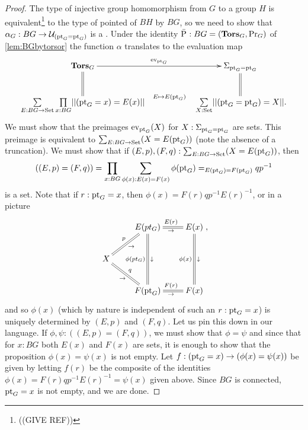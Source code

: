 \begin{proof}
  The type of injective group homomorphism from $G$ to a group $H$ is equivalent\footnote{((GIVE REF))} to the type of pointed \coverings of $BH$ by $BG$, so we need to show that $\alpha_G:BG\to\mathcal{U}_{({\mathord{\mathrm{pt}}}_G={\mathord{\mathrm{pt}}}_G)}$ is a \covering.  
Under the identity $\bar{\mathrm{P}_{}}:BG=(\mathbf{Tors}_G,\mathrm{Pr}_{{G}})$ of \cref{lem:BGbytorsor} the function $\alpha$ translates to the evaluation map
$$\xymatrix{
  \typetorsor_G\ar[rr]^-{\mathrm{ev}_{\pt_G}}\ar@{=}[d]&&\Sigma_{\pt_G=\pt_G}\ar@{=}[d]\\
  \underset{E:BG\to\Set}\sum\,\underset{x:BG}\prod||(\pt_G=x)=E(x)||\ar@{}[rr]^-{E\mapsto E(\pt_G)}&&
\,\underset{X:\Set}\sum||(\pt_G=\pt_G)=X||.
}$$
We must show that the preimages $\mathrm{ev}_{{\mathord{\mathrm{pt}}}_G}(X)$ for $X:\Sigma_{{\mathord{\mathrm{pt}}}_G={\mathord{\mathrm{pt}}}_G}$ are sets.  
This preimage is equivalent to $\sum_{E:BG\to\mathord{\mathrm{Set}}}(X=E({\mathord{\mathrm{pt}}}_G))$ (note the absence of a truncation).  We must show that if $(E,p),(F,q):\sum_{E:BG\to\mathord{\mathrm{Set}}}(X=E({\mathord{\mathrm{pt}}}_G))$, then 
$$((E,p)=(F,q))=\prod_{x:BG}\sum_{\phi(x):E(x)=F(x)}\phi({\mathord{\mathrm{pt}}}_G)=_{E({\mathord{\mathrm{pt}}}_G)=F({\mathord{\mathrm{pt}}}_G)}qp^{-1}$$ is a set.  
Note that if $r:{\mathord{\mathrm{pt}}}_G=x$, then $\phi(x)=F(r)qp^{-1}E(r)^{-1}$, or in a picture
$$\xymatrix{&E(pt_G)\ar@{=}[r]^{E(r)}_\to\ar@{=}[dd]_{\phi(pt_G)}^\downarrow&E(x)\ar@{=}[dd]_{\phi(x)}^\downarrow\\
  X\ar@{=}[ur]^p_\to\ar@{=}[dr]^q_\to&&\\
  &F(\pt_G)\ar@{=}[r]^{F(r)}_\to&F(x)},$$
and so $\phi(x)$ (which by nature is independent of such an $r:{\mathord{\mathrm{pt}}}_G=x$) is uniquely determined by $(E,p)$ and $(F,q)$.  Let us pin this down in our language.
If $\phi,\psi:((E,p)=(F,q))$, we must show that $\phi=\psi$ and since that for $x:BG$ both $E(x)$ and $F(x)$ are sets, it is enough to show that the proposition $\phi(x)=\psi(x)$ is not empty.  Let $f:({\mathord{\mathrm{pt}}}_G=x)\to(\phi(x)=\psi(x))$ be given by letting $f(r)$ be the composite of the identities $\phi(x)=F(r)qp^{-1}E(r)^{-1}=\psi(x)$ given above.  
Since $BG$ is connected, ${\mathord{\mathrm{pt}}}_G=x$ is not empty, and we are done.
\end{proof}

